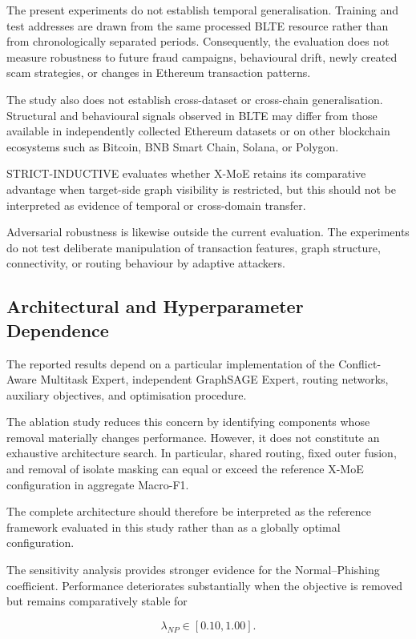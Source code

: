 \documentclass{ieeeaccess}
\begin{document}
The present experiments do not establish temporal generalisation. Training and test addresses are drawn from the same processed BLTE resource rather than from chronologically separated periods. Consequently, the evaluation does not measure robustness to future fraud campaigns, behavioural drift, newly created scam strategies, or changes in Ethereum transaction patterns.

The study also does not establish cross-dataset or cross-chain generalisation. Structural and behavioural signals observed in BLTE may differ from those available in independently collected Ethereum datasets or on other blockchain ecosystems such as Bitcoin, BNB Smart Chain, Solana, or Polygon.

STRICT-INDUCTIVE evaluates whether X-MoE retains its comparative advantage when target-side graph visibility is restricted, but this should not be interpreted as evidence of temporal or cross-domain transfer.

Adversarial robustness is likewise outside the current evaluation. The experiments do not test deliberate manipulation of transaction features, graph structure, connectivity, or routing behaviour by adaptive attackers.


\subsection{Architectural and Hyperparameter Dependence}

The reported results depend on a particular implementation of the Conflict-Aware Multitask Expert, independent GraphSAGE Expert, routing networks, auxiliary objectives, and optimisation procedure.

The ablation study reduces this concern by identifying components whose removal materially changes performance. However, it does not constitute an exhaustive architecture search. In particular, shared routing, fixed outer fusion, and removal of isolate masking can equal or exceed the reference X-MoE configuration in aggregate Macro-F1.

The complete architecture should therefore be interpreted as the reference framework evaluated in this study rather than as a globally optimal configuration.

The sensitivity analysis provides stronger evidence for the Normal--Phishing coefficient. Performance deteriorates substantially when the objective is removed but remains comparatively stable for

\begin{equation}
\lambda_{NP}\in[0.10,1.00].
\end{equation}
\end{document}
